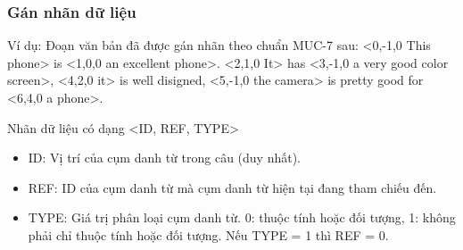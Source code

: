 \documentclass{beamer}
\begin{document}
\begin{frame}
\frametitle{Gán nhãn dữ liệu}
\begin{block}{}
Ví dụ: Đoạn văn bản đã được gán nhãn theo chuẩn MUC-7 sau:
<0,-1,0 This phone> is <1,0,0 an excellent phone>.  <2,1,0 It> has <3,-1,0 a very good color screen>, <4,2,0 it> is well disigned, <5,-1,0 the camera> is pretty good for <6,4,0 a phone>.
\end{block}
\begin{block}{}
Nhãn dữ liệu có dạng <ID, REF, TYPE>
\begin{itemize}
\item ID: Vị trí của cụm danh từ trong câu (duy nhất).
\item REF: ID của cụm danh từ mà cụm danh từ hiện tại đang tham chiếu đến.
\item TYPE: Giá trị phân loại cụm danh từ. 0: thuộc tính hoặc đối tượng, 1: không phải chỉ thuộc tính hoặc đối tượng. Nếu TYPE = 1 thì REF = 0.
\end{itemize}
\end{block}
\end{frame}
\end{document}
